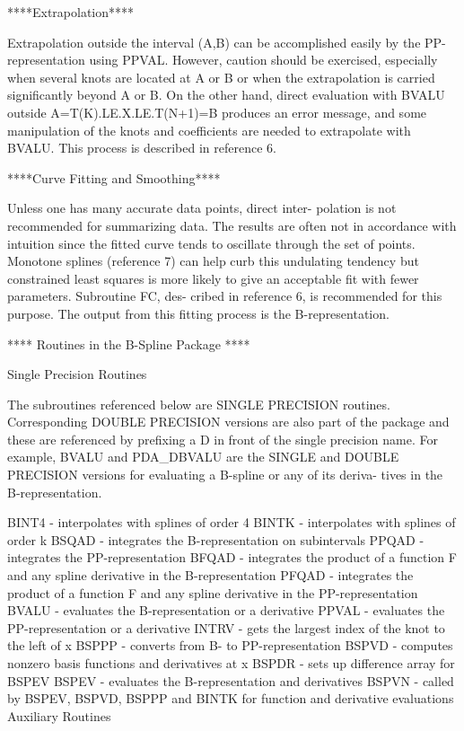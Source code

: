 \documentclass[11pt,twoside,nolof]{starlink}
\begin{document}
\begin{terminalv}
                      ****Extrapolation****

     Extrapolation outside the interval (A,B) can be accomplished
     easily by the PP-representation using PPVAL.  However,
     caution should be exercised, especially when several knots
     are located at A or B or when the extrapolation is carried
     significantly beyond A or B.  On the other hand, direct
     evaluation with BVALU outside A=T(K).LE.X.LE.T(N+1)=B
     produces an error message, and some manipulation of the knots
     and coefficients are needed to extrapolate with BVALU.  This
     process is described in reference 6.

                ****Curve Fitting and Smoothing****

     Unless one has many accurate data points, direct inter-
     polation is not recommended for summarizing data.  The
     results are often not in accordance with intuition since the
     fitted curve tends to oscillate through the set of points.
     Monotone splines (reference 7) can help curb this undulating
     tendency but constrained least squares is more likely to give an
     acceptable fit with fewer parameters.  Subroutine FC, des-
     cribed in reference 6, is recommended for this purpose.  The
     output from this fitting process is the B-representation.

              **** Routines in the B-Spline Package ****

                      Single Precision Routines

         The subroutines referenced below are SINGLE PRECISION
         routines. Corresponding DOUBLE PRECISION versions are also
         part of the package and these are referenced by prefixing
         a D in front of the single precision name. For example,
         BVALU and PDA_DBVALU are the SINGLE and DOUBLE PRECISION
         versions for evaluating a B-spline or any of its deriva-
         tives in the B-representation.

     BINT4 - interpolates with splines of order 4
     BINTK - interpolates with splines of order k
     BSQAD - integrates the B-representation on subintervals
     PPQAD - integrates the PP-representation
     BFQAD - integrates the product of a function F and any spline
             derivative in the B-representation
     PFQAD - integrates the product of a function F and any spline
             derivative in the PP-representation
     BVALU - evaluates the B-representation or a derivative
     PPVAL - evaluates the PP-representation or a derivative
     INTRV - gets the largest index of the knot to the left of x
     BSPPP - converts from B- to PP-representation
     BSPVD - computes nonzero basis functions and derivatives at x
     BSPDR - sets up difference array for BSPEV
     BSPEV - evaluates the B-representation and derivatives
     BSPVN - called by BSPEV, BSPVD, BSPPP and BINTK for function and
             derivative evaluations
                        Auxiliary Routines


\end{terminalv}
\end{document}
